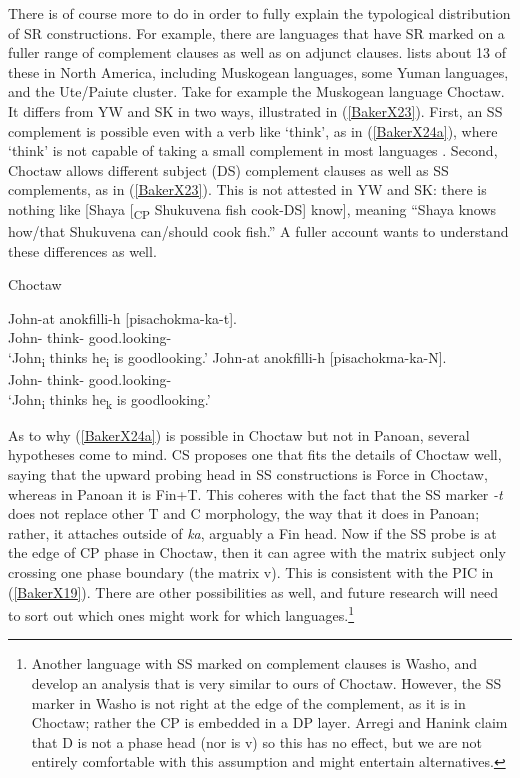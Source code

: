 \documentclass[output=paper]{langscibook}
\begin{document}
There is of course more to do in order to fully explain the typological distribution of SR constructions. For example, there are languages that have SR marked on a fuller range of complement clauses as well as on adjunct clauses. \citet{mckenzie2015survey} lists about 13 of these in North America, including Muskogean languages, some Yuman languages, and the Ute/Paiute cluster. Take for example the Muskogean language Choctaw. It differs from YW and SK in two ways, illustrated in (\ref{BakerX23}). First, an SS complement is possible even with a verb like ‘think’, as in (\ref{BakerX24a}), where ‘think’ is not capable of taking a small complement in most languages \citep{wurmbrand2001infinitives}. Second, Choctaw allows different subject (DS) complement clauses as well as SS complements, as in (\ref{BakerX23}). This is not attested in YW and SK: there is nothing like [Shaya [\textsubscript{CP} Shukuvena fish cook-DS] know], meaning “Shaya knows how/that Shukuvena can/should cook fish.” A fuller account wants to understand these differences as well.

\begin{exe}
    \ex Choctaw \citep[269]{broadwell2006choctaw} \label{BakerX24}
	    \begin{xlist}
			\ex \label{BakerX24a}
			\gll John-at anokfilli-h [pisachokma-ka-t].\\
			    John- think- good.looking-\\
			    \glt `John\textsubscript{i} thinks he\textsubscript{i} is goodlooking.'
			\ex \label{BakerX24b}
			\gll John-at anokfilli-h [pisachokma-ka-N].\\
    			 John- think- good.looking-\\
			    \glt `John\textsubscript{i} thinks he\textsubscript{k} is goodlooking.'
		\end{xlist}
\end{exe}

As to why (\ref{BakerX24a}) is possible in Choctaw but not in Panoan, several hypotheses come to mind. CS proposes one that fits the details of Choctaw well, saying that the upward probing head in SS constructions is Force in Choctaw, whereas in Panoan it is Fin+T. This coheres with the fact that the SS marker \textit{-t} does not replace other T and C morphology, the way that it does in Panoan; rather, it attaches outside of \textit{ka}, arguably a Fin head. Now if the SS probe is at the edge of CP phase in Choctaw, then it can agree with the matrix subject only crossing one phase boundary (the matrix v). This is consistent with the PIC in (\ref{BakerX19}). There are other possibilities as well, and future research will need to sort out which ones might work for which languages.\footnote{Another language with SS marked on complement clauses is Washo, and \citet{arregi2019switch} develop an analysis that is very similar to ours of Choctaw. However, the SS marker in Washo is not right at the edge of the complement, as it is in Choctaw; rather the CP is embedded in a DP layer. Arregi and Hanink claim that D is not a phase head (nor is v) so this has no effect, but we are not entirely comfortable with this assumption and might entertain alternatives.}
\end{document}
